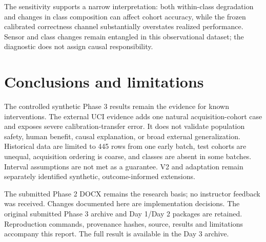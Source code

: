\documentclass[10pt]{article}
\begin{document}
The sensitivity supports a narrow interpretation: both within-class degradation and changes in class composition can affect cohort accuracy, while the frozen calibrated correctness channel substantially overstates realized performance. Sensor and class changes remain entangled in this observational dataset; the diagnostic does not assign causal responsibility.

\section{Conclusions and limitations}
The controlled synthetic Phase 3 results remain the evidence for known interventions. The external UCI evidence adds one natural acquisition-cohort case and exposes severe calibration-transfer error. It does not validate population safety, human benefit, causal explanation, or broad external generalization. Historical data are limited to 445 rows from one early batch, test cohorts are unequal, acquisition ordering is coarse, and classes are absent in some batches. Interval assumptions are not met as a guarantee. V2 and adaptation remain separately identified synthetic, outcome-informed extensions.

The submitted Phase 2 DOCX remains the research basis; no instructor feedback was received. Changes documented here are implementation decisions. The original submitted Phase 3 archive and Day 1/Day 2 packages are retained. Reproduction commands, provenance hashes, source, results and limitations accompany this report. The full result is available in the Day 3 archive.



\end{document}
